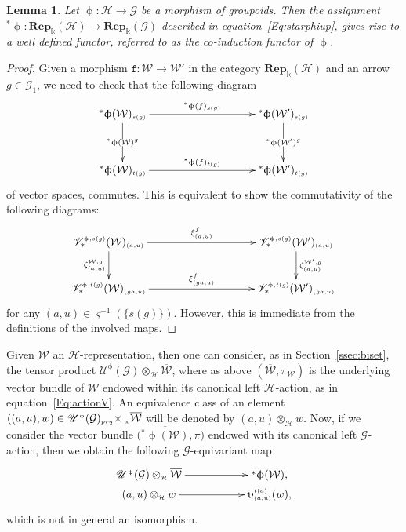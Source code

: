 \documentclass[11pt]{article}
\numberwithin{equation}{section}
\newtheorem{Lemma}[Theorem]{Lemma}
\newcommand{\tensor}[1]{\otimes_{\scriptscriptstyle{#1}}}
\newcommand{\bara}[1]{\overline{#1}}
\newcommand{\Rep}[1]{\mathbf{Rep}_{\Sscript{\Bbbk}}(#1)}
\newcommand{\tF}{\texttt{f}}
\newcommand{\Ga}{\cG_{\Sscript{1}}}
\newcommand{\uU}{\mathscr{U}}
\newcommand{\vV}{\mathscr{V}}
\newcommand{\cG}{{\mathcal G}}
\newcommand{\cH}{{\mathcal H}}
\newcommand{\cW}{{\mathcal W}}
\newcommand{\Sscript}[1]{\scriptscriptstyle{#1}}
\newcommand{\due}[3]{{}_{{#2 }} {#1}_{{ #3}} }
\newcommand{\upg}{\uU^{\Sscript{\upphi}}(\cG)}
\newcommand{\pls}{{}^{*}\upphi}
\begin{document}
\begin{Lemma}\label{lema:Co-Induction}Let $\upphi\colon \cH \to \cG$ be a morphism of groupoids. Then the assignment ${}^{*}\upphi\colon \Rep{\cH} \to \Rep{\cG}$ described in equation~\eqref{Eq:starphiup}, gives rise to a well defined functor, referred to as {\rm the co-induction functor} of $\upphi$.
\end{Lemma}
\begin{proof}Given a morphism $\tF\colon \cW \to \cW'$ in the category $\Rep{\cH}$ and an arrow $g \in \Ga$, we need to check that the following diagram
\begin{gather*}
\xymatrix@C=45pt@R=35pt{ \pls(\cW)_{\Sscript{s(g)}} \ar@{->}^-{
\pls(\tF)_{\Sscript{s(g)}}}[rr]
\ar@{->}|-{\pls(\cW)^{\Sscript{g}}}[d] & &
\pls(\cW')_{\Sscript{s(g)}} \ar@{->}|-{\pls(\cW')^{\Sscript{g}}}[d]
\\ \pls(\cW)_{\Sscript{t(g)}} \ar@{->}^-{
\pls(\tF)_{\Sscript{t(g)}} }[rr] & & \pls(\cW')_{\Sscript{t(g)}} }
\end{gather*}
of vector spaces, commutes. This is equivalent to show the commutativity of the following diag\-rams:
\begin{gather*}
\xymatrix@C=45pt@R=25pt{ \vV^{\Sscript{\upphi,
s(g)}}_*(\cW)_{\Sscript{(a, u)}} \ar@{->}^-{
\xi^{\Sscript{\tF}}_{\Sscript{(a,u)}}}[rr]
\ar@{->}_-{\zeta_{\Sscript{(a,u)}}^{\Sscript{\cW, g}}}[d] & &
\vV^{\Sscript{\upphi, s(g)}}_*(\cW')_{\Sscript{(a, u)}}
\ar@{->}^-{\zeta_{\Sscript{(a,u)}}^{\Sscript{\cW', g}}}[d] \\
\vV^{\Sscript{\upphi, t(g)}}_*(\cW)_{\Sscript{(ga, u)}}
\ar@{->}^-{ \xi^{\Sscript{\tF}}_{\Sscript{(ga,u)}} }[rr] & &
\vV^{\Sscript{\upphi, t(g)}}_*(\cW')_{\Sscript{(ga, u)}} }
\end{gather*}
for any $(a, u) \in \varsigma^{-1}(\{s(g)\})$. However, this is immediate from the definitions of the involved maps.
\end{proof}

\begin{Remark}Given $\cW$ an $\cH$-representation, then one can consider, as in Section~\ref{ssec:biset}, the tensor product $\upg \tensor{\cH} \bara{\cW}$, where as above $(\bara{\cW},\pi_{\Sscript{\cW}})$ is the underlying vector bundle of $\cW$ endowed within its canonical left $\cH$-action, as in equation~\eqref{Eq:actionV}. An equivalence class of an element $((a,u),w) \in \upg \due \times {\Sscript{{\rm pr}_2}}{\; \Sscript{\pi}} \bara{\cW}$ will be denoted by $(a,u)\tensor{\cH}w$. Now, if we consider the vector bundle $\big(\bara{{}^*\upphi(\cW)}, \pi \big)$ endowed with its canonical left $\cG$-action, then we obtain the following $\cG$-equivariant map
\begin{gather*}
\xymatrix@R=0pt{ \upg \tensor{\cH} \bara{\cW} \ar@{->}^-{}[rr] & & \bara{{}^*\upphi(\cW)}, \\ (a,u)\tensor{\cH}w \ar@{|->}^-{}[rr] & &
\upupsilon^{\Sscript{t(a)}}_{\Sscript{(a,u)}} (w), }
\end{gather*}
which is not in general an isomorphism.
\end{Remark}
\end{document}
